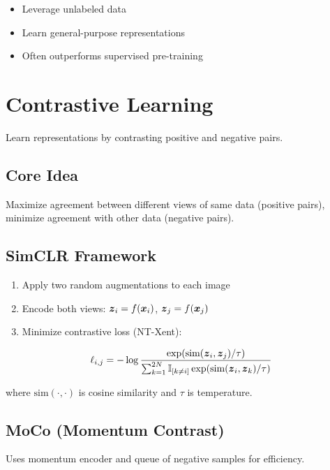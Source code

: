 \begin{itemize}
    \item Leverage unlabeled data
    \item Learn general-purpose representations
    \item Often outperforms supervised pre-training
\end{itemize}

\section{Contrastive Learning}
\label{sec:contrastive-learning}

Learn representations by contrasting positive and negative pairs.

\subsection{Core Idea}

Maximize agreement between different views of same data (positive pairs), minimize agreement with other data (negative pairs).

\subsection{SimCLR Framework}

\begin{enumerate}
    \item Apply two random augmentations to each image
    \item Encode both views: $\boldsymbol{z}_i = f(\boldsymbol{x}_i)$, $\boldsymbol{z}_j = f(\boldsymbol{x}_j)$
    \item Minimize contrastive loss (NT-Xent):
\end{enumerate}

\begin{equation}
\ell_{i,j} = -\log \frac{\exp(\text{sim}(\boldsymbol{z}_i, \boldsymbol{z}_j)/\tau)}{\sum_{k=1}^{2N} \mathbb{I}_{[k \neq i]} \exp(\text{sim}(\boldsymbol{z}_i, \boldsymbol{z}_k)/\tau)}
\end{equation}

where $\text{sim}(\cdot, \cdot)$ is cosine similarity and $\tau$ is temperature.

\subsection{MoCo (Momentum Contrast)}

Uses momentum encoder and queue of negative samples for efficiency.

